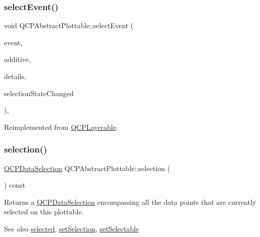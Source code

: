 \subsubsection{\texorpdfstring{selectEvent()}{selectEvent()}}
{\footnotesize\ttfamily void Q\+C\+P\+Abstract\+Plottable\+::select\+Event (\begin{DoxyParamCaption}\item[{Q\+Mouse\+Event $\ast$}]{event,  }\item[{bool}]{additive,  }\item[{const Q\+Variant \&}]{details,  }\item[{bool $\ast$}]{selection\+State\+Changed }\end{DoxyParamCaption})\hspace{0.3cm}{\ttfamily [protected]}, {\ttfamily [virtual]}}



Reimplemented from \mbox{\hyperlink{class_q_c_p_layerable_a7498c2d0d081cf7cad0fb3bb93aa0e91}{Q\+C\+P\+Layerable}}.

\mbox{\label{class_q_c_p_abstract_plottable_a040bf09f41d456284cfd39cc37aa068f}} 
\subsubsection{\texorpdfstring{selection()}{selection()}}
{\footnotesize\ttfamily \mbox{\hyperlink{class_q_c_p_data_selection}{Q\+C\+P\+Data\+Selection}} Q\+C\+P\+Abstract\+Plottable\+::selection (\begin{DoxyParamCaption}{ }\end{DoxyParamCaption}) const\hspace{0.3cm}{\ttfamily [inline]}}

Returns a \mbox{\hyperlink{class_q_c_p_data_selection}{Q\+C\+P\+Data\+Selection}} encompassing all the data points that are currently selected on this plottable.

\begin{DoxySeeAlso}{See also}
\mbox{\hyperlink{class_q_c_p_abstract_plottable_a0b3b514474fe93354fc74cfc144184b4}{selected}}, \mbox{\hyperlink{class_q_c_p_abstract_plottable_a219bc5403a9d85d3129165ec3f5ae436}{set\+Selection}}, \mbox{\hyperlink{class_q_c_p_abstract_plottable_ac238d6e910f976f1f30d41c2bca44ac3}{set\+Selectable}} 
\end{DoxySeeAlso}
\mbox{\label{class_q_c_p_abstract_plottable_af80ad8531642e786b6f4fad551c203c4}} 
